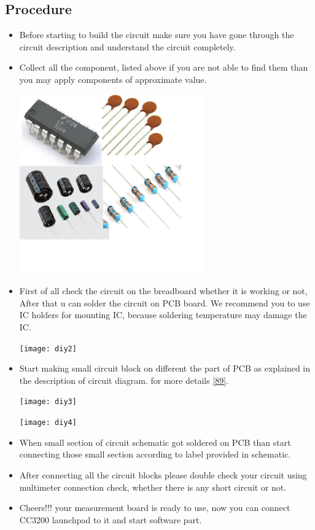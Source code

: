 \documentclass[a4paper,12pt,oneside]{book}
\begin{document}
\begin{appendices}
\subsection*{Procedure}
\begin{itemize}
	\item Before starting to build the circuit make sure you have gone through the circuit description and understand the circuit completely.
	\newpage
	\item Collect all the component, listed above if you are not able to find them than you may apply components of approximate value.\\
	\begin{center}
		\includegraphics[width=300px]{diy1}
	\end{center}
	\item First of all check the circuit on the breadboard whether it is working or not, After that u can solder the circuit on PCB board. We recommend you to use IC holders for mounting IC, because soldering temperature may damage the IC. 
	\begin{center}
		\texttt{[image: diy2]}
	\end{center}
	\item Start making small circuit block on different the part of PCB as explained in the description of circuit diagram. for more details \autoref{89}.
	\begin{center}
		\texttt{[image: diy3]}
	\end{center}
	\begin{center}
		\texttt{[image: diy4]}
	\end{center}
	\item When small section of circuit schematic got soldered on PCB than start connecting those small section according to label provided in schematic.
	\item After connecting all the circuit blocks please double check your circuit using multimeter connection check, whether there is any short circuit or not. 
	\item Cheers!!! your measurement board is ready to use, now you can connect CC3200 launchpad to it and start software part. 
\end{itemize}

\end{appendices}
\end{document}
